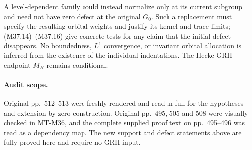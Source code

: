 A level-dependent family could instead normalize only
at its current subgroup and need not have zero defect
at the original $G_0$.  Such a replacement must specify
the resulting orbital weights and justify its kernel
and trace limits; (M37.14)--(M37.16) give concrete
tests for any claim that the initial defect disappears.
No boundedness, $L^1$ convergence, or invariant orbital
allocation is inferred from the existence of the
individual indentations.  The Hecke-GRH endpoint
$M_H$ remains conditional.

\paragraph{Audit scope.}
Original pp.~512--513 were freshly rendered and read
in full for the hypotheses and extension-by-zero
construction.  Original pp.~495, 505 and 508 were
visually checked in MT-M36, and the complete supplied
proof text on pp.~495--496 was read as a dependency
map.  The new support and defect statements above
are fully proved here and require no GRH input.
